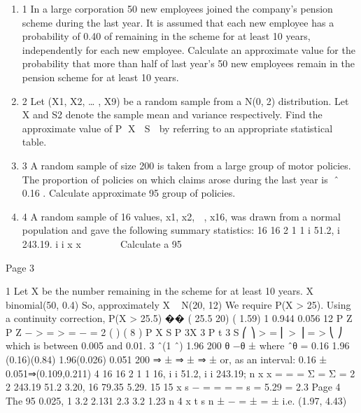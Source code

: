 \documentclass[a4paper,12pt]{article}
\begin{document}
\begin{enumerate}
\item

1 In a large corporation 50 new employees joined the company’s pension scheme
during the last year. It is assumed that each new employee has a probability of 0.40
of remaining in the scheme for at least 10 years, independently for each new
employee.
Calculate an approximate value for the probability that more than half of last year’s
50 new employees remain in the pension scheme for at least 10 years. 
\item 2 Let (X1, X2, … , X9) be a random sample from a N(0,2) distribution. Let X and
S2 denote the sample mean and variance respectively.
Find the approximate value of P X  S  by referring to an appropriate statistical
table. 
\item 3 A random sample of size 200 is taken from a large group of motor policies. The
proportion of policies on which claims arose during the last year is ˆ  0.16 .
Calculate approximate 95%
group of policies. 
\item 4 A random sample of 16 values, x1, x2,  , x16, was drawn from a normal population
and gave the following summary statistics:
16 16
2
1 1
i 51.2, i 243.19.
i i
x x
 
   
Calculate a 95%

\end{enumerate}

Page 3

1 Let X be the number remaining in the scheme for at least 10 years.
X ~ binomial(50, 0.4)
So, approximately X ~ N(20, 12)
We require P(X > 25).
Using a continuity correction,
P(X > 25.5) �� ( 25.5 20) ( 1.59) 1 0.944 0.056
12
P Z P Z −
> = > = − =
2 ( ) ( 8 )
P X S P 3X 3 P t 3
S
⎛ ⎞
> = ⎜ > ⎟ = >
⎝ ⎠
which is between 0.005 and 0.01.
3 ˆ(1 ˆ) 1.96
200
θ −θ
± where ˆθ = 0.16
1.96 (0.16)(0.84) 1.96(0.026) 0.051
200
⇒ ± ⇒ ± ⇒ ±
or, as an interval: 0.16 ± 0.051⇒(0.109,0.211)
4 16 16 2
1 1 16, i i 51.2, i i 243.19; n x x = = = Σ = Σ =
2
2
243.19 51.2 3.20, 16 79.35 5.29.
15 15
x s
−
= = = =
s = 5.29 = 2.3
Page 4
The 95%
0.025, 1
3.2 2.131 2.3 3.2 1.23
n 4
x t s
n ± − = ± = ±
i.e. (1.97, 4.43)
\end{document}
